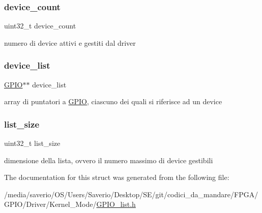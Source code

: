 \subsubsection{\texorpdfstring{device\+\_\+count}{device\_count}}
{\footnotesize\ttfamily uint32\+\_\+t device\+\_\+count}

numero di device attivi e gestiti dal driver \mbox{\label{structGPIO__list_a1f17219814029f429cd2f3fdf4190e0b}} 
\subsubsection{\texorpdfstring{device\+\_\+list}{device\_list}}
{\footnotesize\ttfamily \hyperlink{structGPIO}{G\+P\+IO}$\ast$$\ast$ device\+\_\+list}

array di puntatori a \hyperlink{structGPIO}{G\+P\+IO}, ciascuno dei quali si riferisce ad un device \mbox{\label{structGPIO__list_aeff61809685e5df1b38aec1d871a49bb}} 
\subsubsection{\texorpdfstring{list\+\_\+size}{list\_size}}
{\footnotesize\ttfamily uint32\+\_\+t list\+\_\+size}

dimensione della lista, ovvero il numero massimo di device gestibili 

The documentation for this struct was generated from the following file\+:\begin{DoxyCompactItemize}
\item 
/media/saverio/\+O\+S/\+Users/\+Saverio/\+Desktop/\+S\+E/git/codici\+\_\+da\+\_\+mandare/\+F\+P\+G\+A/\+G\+P\+I\+O/\+Driver/\+Kernel\+\_\+\+Mode/\hyperlink{GPIO__list_8h}{G\+P\+I\+O\+\_\+list.\+h}\end{DoxyCompactItemize}
